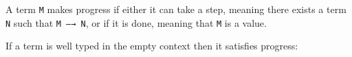 \begin{fence}
\begin{code}%
\>[0]\AgdaSpace{}%
\AgdaSpace{}%
\AgdaSymbol{(}\AgdaSpace{}%
\AgdaSymbol{:}\AgdaSpace{}%
\AgdaSymbol{)}\AgdaSpace{}%
\AgdaSymbol{:}\AgdaSpace{}%
\AgdaSpace{}%
\<%
\\
%
\\[\AgdaEmptyExtraSkip]%
\>[0][@{}l@{\AgdaIndent{0}}]%
\>[2]\AgdaSpace{}%
\AgdaSymbol{:}\AgdaSpace{}%
\AgdaSpace{}%
\AgdaSymbol{\{}\AgdaSymbol{\}}\<%
\\
\>[2][@{}l@{\AgdaIndent{0}}]%
\>[4]%
\>[225I]\AgdaSpace{}%
\AgdaSpace{}%
\<%
\\
\>[.][@{}l@{}]\<[225I]%
\>[6]\AgdaComment{----------}\<%
\\
%
\>[4]\AgdaSpace{}%
\AgdaSpace{}%
\<%
\\
%
\\[\AgdaEmptyExtraSkip]%
%
\>[2]\AgdaSpace{}%
\AgdaSymbol{:}\<%
\\
\>[2][@{}l@{\AgdaIndent{0}}]%
\>[6]\AgdaSpace{}%
\<%
\\
%
\>[6]\AgdaComment{----------}\<%
\\
\>[2][@{}l@{\AgdaIndent{0}}]%
\>[4]\AgdaSpace{}%
\AgdaSpace{}%
\<%
\end{code}
\end{fence}

A term \texttt{M} makes progress if either it can take a step, meaning
there exists a term \texttt{N} such that \texttt{M\ —→\ N}, or if it is
done, meaning that \texttt{M} is a value.

If a term is well typed in the empty context then it satisfies progress:

